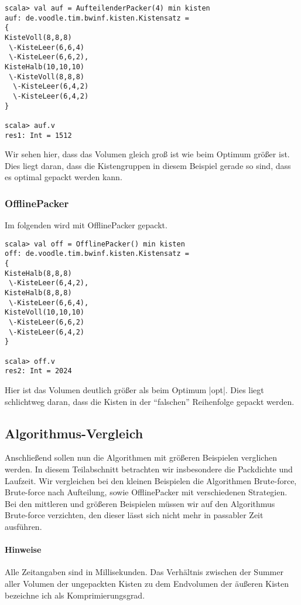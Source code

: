 \begin{lstlisting}
scala> val auf = AufteilenderPacker(4) min kisten
auf: de.voodle.tim.bwinf.kisten.Kistensatz = 
{
KisteVoll(8,8,8)
 \-KisteLeer(6,6,4)
 \-KisteLeer(6,6,2),
KisteHalb(10,10,10)
 \-KisteVoll(8,8,8)
  \-KisteLeer(6,4,2)
  \-KisteLeer(6,4,2)
}

scala> auf.v
res1: Int = 1512
\end{lstlisting}
 Wir sehen hier, dass das Volumen gleich groß ist wie beim Optimum größer ist.
 Dies liegt daran, dass die Kistengruppen in diesem Beispiel gerade so sind,
  dass es optimal gepackt werden kann.

\subsubsection*{OfflinePacker}
Im folgenden wird mit OfflinePacker gepackt.

\begin{lstlisting}
scala> val off = OfflinePacker() min kisten
off: de.voodle.tim.bwinf.kisten.Kistensatz = 
{
KisteHalb(8,8,8)
 \-KisteLeer(6,4,2),
KisteHalb(8,8,8)
 \-KisteLeer(6,6,4),
KisteVoll(10,10,10)
 \-KisteLeer(6,6,2)
 \-KisteLeer(6,4,2)
}

scala> off.v
res2: Int = 2024

\end{lstlisting}
 Hier ist das Volumen deutlich größer als beim Optimum |opt|.
 Dies liegt schlichtweg daran, dass die Kisten in der ``falschen'' Reihenfolge gepackt werden.
\\
\subsection{Algorithmus-Vergleich}
\label{algcont}
 Anschließend sollen nun die Algorithmen mit größeren Beispielen verglichen werden.
 In diesem Teilabschnitt betrachten wir insbesondere die Packdichte und Laufzeit.
 Wir vergleichen bei den kleinen Beispielen die Algorithmen Brute-force, Brute-force nach Aufteilung, sowie OfflinePacker mit verschiedenen Strategien.
 Bei den mittleren und größeren Beispielen müssen wir auf den Algorithmus Brute-force verzichten, den dieser lässt sich nicht mehr in passabler Zeit ausführen.
\paragraph{Hinweise}
 Alle Zeitangaben sind in Millisekunden.
 Das Verhältnis zwischen der Summer aller Volumen der ungepackten Kisten zu dem Endvolumen der äußeren Kisten bezeichne ich als Komprimierungsgrad.
